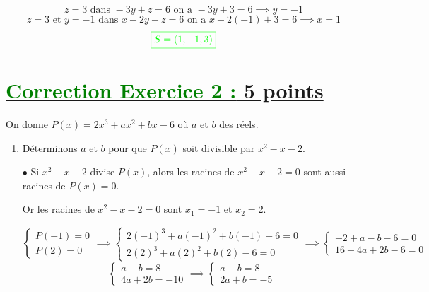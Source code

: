 \documentclass[12pt,a4paper]{article}
\begin{document}
\begin{enumerate}
    \[z=3 \text{ dans } -3y+z=6  \text{ on a } -3y+3=6 \implies y=-1\]
    \[\text{$z=3 $ et $y=-1$ dans } x - 2y + z = 6  \text{ on a } x - 2(-1) + 3 = 6 \implies x=1\]
\[
\textcolor{green}{\boxed{S = (1,-1,3)   }} 
\]
\end{enumerate}

\section*{\underline{\textcolor{green}{Correction Exercice 2 :} 5 points}}

On donne \( P(x) = 2x^3 + ax^2 + bx - 6 \) où \( a \) et \( b \) des réels.

\begin{enumerate}
    \item Déterminons \( a \) et \( b \) pour que \( P(x) \) soit divisible par \( x^2 - x - 2 \).

    \item[\( \bullet \)] Si \( x^2 - x - 2 \) divise \( P(x) \), alors les racines de \( x^2 - x - 2 = 0 \) sont aussi racines de \( P(x) = 0 \).

Or les racines de \( x^2 - x - 2 = 0 \) sont \( x_1 = -1 \) et \( x_2 = 2 \).

\[
\begin{cases}
P(-1) = 0 \\
P(2) = 0
\end{cases}\implies 
\begin{cases}
2(-1)^3 + a(-1)^2 + b(-1) - 6 = 0 \\
2(2)^3 + a(2)^2 + b(2) - 6 = 0 
\end{cases}\implies 
\begin{cases}
-2 + a - b - 6 = 0 \\
16 + 4a + 2b - 6 = 0
\end{cases}
\]
\[
\begin{cases}
a - b  = 8 \\
4a + 2b = -10
\end{cases}\implies 
\begin{cases}
a - b  = 8 \\
2a + b = -5
\end{cases}
\]


\end{enumerate}
\end{document}
